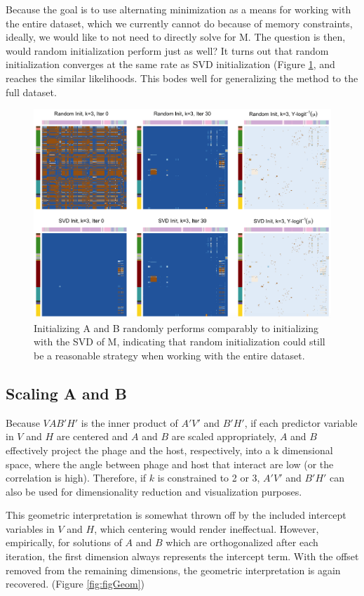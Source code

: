 \documentclass[12pt,twoside]{mitthesis-manusdown}
\begin{document}
Because the goal is to use alternating minimization as a means for
working with the entire dataset, which we currently cannot do because of
memory constraints, ideally, we would like to not need to directly solve
for M. The question is then, would random initialization perform just as
well? It turns out that random initialization converges at the same rate
as SVD initialization (Figure \ref{fig:figPred}, and reaches the similar
likelihoods. This bodes well for generalizing the method to the full
dataset.
\begin{figure}[tb!]

{\centering \includegraphics[width=0.8\linewidth]{figurespred/figPred} 

}

\caption{\label{fig:figPred}Initializing A and B randomly performs comparably to initializing with the SVD of M, indicating that random initialization could still be a reasonable strategy when working with the entire dataset.}\label{fig:figPred}
\end{figure}
\subsection{Scaling A and B}\label{scaling-a-and-b}

Because \(VAB'H'\) is the inner product of \(A'V'\) and \(B'H'\), if
each predictor variable in \(V\) and \(H\) are centered and \(A\) and
\(B\) are scaled appropriately, \(A\) and \(B\) effectively project the
phage and the host, respectively, into a k dimensional space, where the
angle between phage and host that interact are low (or the correlation
is high). Therefore, if \(k\) is constrained to 2 or 3, \(A'V'\) and
\(B'H'\) can also be used for dimensionality reduction and visualization
purposes.

This geometric interpretation is somewhat thrown off by the included
intercept variables in \(V\) and \(H\), which centering would render
ineffectual. However, empirically, for solutions of \(A\) and \(B\)
which are orthogonalized after each iteration, the first dimension
always represents the intercept term. With the offset removed from the
remaining dimensions, the geometric interpretation is again recovered.
(Figure \ref{fig:figGeom})
\end{document}
